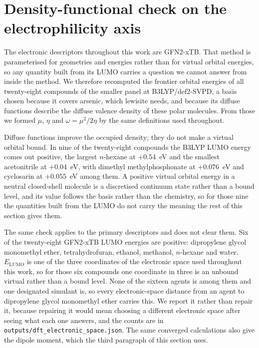 \documentclass[journal=jacsat,manuscript=suppinfo,margin=1in]{achemso}
\begin{document}
\section{Density-functional check on the electrophilicity axis}
\label{meth:dft}

The electronic descriptors throughout this work are GFN2-xTB. That method is
parameterised for geometries and energies rather than for virtual orbital
energies, so any quantity built from its LUMO carries a question we cannot
answer from inside the method. We therefore recomputed the frontier orbital
energies of all twenty-eight compounds of the smaller panel at
B3LYP/def2-SVPD, a basis chosen because it covers arsenic, which lewisite
needs, and because its diffuse functions describe the diffuse valence density
of these polar molecules. From those we
formed $\mu$, $\eta$ and $\omega = \mu^{2}/2\eta$ by the same definitions used
throughout.

Diffuse functions improve the occupied density; they do not make a virtual
orbital bound. In nine of the twenty-eight compounds the B3LYP LUMO energy
comes out positive, the largest $n$-hexane at $+0.54$~eV and the smallest
acetonitrile at $+0.04$~eV, with dimethyl methylphosphonate at $+0.076$~eV and
cyclosarin at $+0.055$~eV among them. A positive virtual orbital energy in a
neutral closed-shell molecule is a discretised continuum state rather than a
bound level, and its value follows the basis rather than the chemistry, so for
those nine the quantities built from the LUMO do not carry the meaning the rest
of this section gives them.

The same check applies to the primary descriptors and does not clear them. Six
of the twenty-eight GFN2-xTB LUMO energies are positive: dipropylene glycol
monomethyl ether, tetrahydrofuran, ethanol, methanol, $n$-hexane and water.
$E_{\mathrm{LUMO}}$ is one of the three coordinates of the electronic space
used throughout this work, so for those six compounds one coordinate in three
is an unbound virtual rather than a bound level. None of the sixteen agents is
among them and one designated simulant is, so every electronic-space distance
from an agent to dipropylene glycol monomethyl ether carries this. We report it
rather than repair it, because repairing it would mean choosing a different
electronic space after seeing what each one answers, and the counts are in
\texttt{outputs/dft\_electronic\_space.json}. The same converged calculations also give the dipole moment, which
the third paragraph of this section uses.
\end{document}
